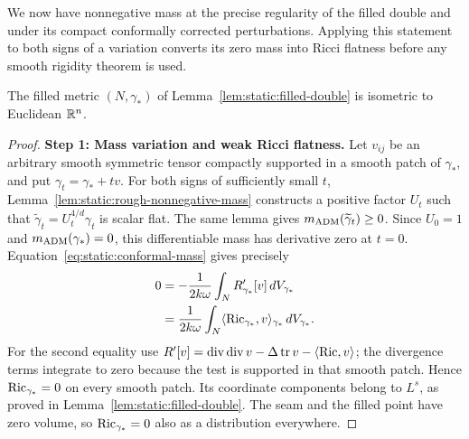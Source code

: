 We now have nonnegative mass at the precise regularity of the filled
double and under its compact conformally corrected perturbations.
Applying this statement to both signs of a variation converts its
zero mass into Ricci flatness before any smooth rigidity theorem is
used.

\begin{proposition}
\label{prop:static:euclidean-double}
The filled metric $(N,\gamma_*)$ of
Lemma~\ref{lem:static:filled-double} is isometric to Euclidean
$\mathbb R^n$.
\end{proposition}

\begin{proof}
\smallskip\noindent
\textbf{Step 1: Mass variation and weak Ricci flatness.}
Let $v_{ij}$ be an arbitrary smooth symmetric tensor compactly
supported in a smooth patch of $\gamma_*$, and put
$\gamma_t=\gamma_*+tv$.  For both signs of sufficiently small $t$,
Lemma~\ref{lem:static:rough-nonnegative-mass} constructs a positive
factor $U_t$ such that $\widetilde\gamma_t=U_t^{4/d}\gamma_t$ is
scalar flat.  The same lemma gives
$m_{\rm ADM}(\widetilde\gamma_t)\ge0$.
Since $U_0=1$ and $m_{\rm ADM}(\gamma_*)=0$, this differentiable
mass has derivative zero at $t=0$.
Equation~\eqref{eq:static:conformal-mass} gives precisely
\begin{align*}
 0
 &= -\frac{1}{2k\omega}\int_N
          R'_{\gamma_*}[v]\,dV_{\gamma_*}\\
 &= \frac{1}{2k\omega}\int_N
          \langle\operatorname{Ric}_{\gamma_*},v\rangle_{\gamma_*}\,dV_{\gamma_*}.
\end{align*}
For the second equality use
$R'[v]=\operatorname{div}\operatorname{div} v-\Delta\operatorname{tr} v-\langle\operatorname{Ric},v\rangle$;
the divergence terms integrate to zero because the test is
supported in that smooth patch.  Hence $\operatorname{Ric}_{\gamma_*}=0$ on every
smooth patch.  Its coordinate components belong to $L^s$, as proved
in Lemma~\ref{lem:static:filled-double}.  The seam and the filled
point have zero volume, so $\operatorname{Ric}_{\gamma_*}=0$ also as a
distribution everywhere.


\end{proof}
